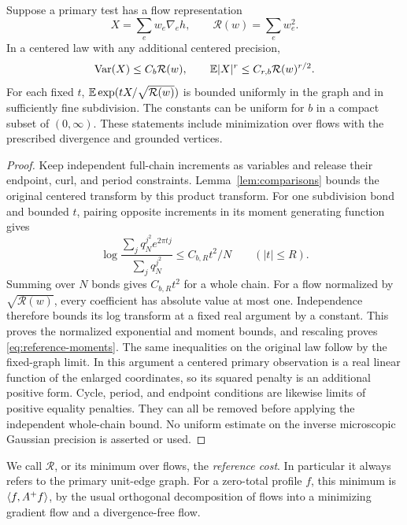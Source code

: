 \begin{lemma}\label{lem:reference-cost}
Suppose a primary test has a flow representation
\[
 X=\sum_e w_e\nabla_e h,\qquad
 \mathcal R(w)=\sum_e w_e^2.
\]
In a centered law with any additional centered precision,
\begin{equation}
 \operatorname{Var}(X)\le C_b\mathcal R(w),\qquad
 \mathbb E|X|^r\le C_{r,b}\mathcal R(w)^{r/2}.
 \label{eq:reference-moments}
\end{equation}
For each fixed \(t\),
\(\mathbb E\exp(tX/\sqrt{\mathcal R(w)})\) is bounded uniformly in the graph
and in sufficiently fine subdivision. The constants can be uniform
for \(b\) in a compact subset of \((0,\infty)\).
These statements include minimization over flows with the prescribed
divergence and grounded vertices.
\end{lemma}

\begin{proof}
Keep independent full-chain increments as variables and release
their endpoint, curl, and period constraints. Lemma~\ref{lem:comparisons}
bounds the original centered transform by this product transform.
For one subdivision bond and bounded \(t\), pairing opposite
increments in its moment generating function gives
\[
 \log\frac{\sum_jq_N^{j^2}e^{2\pi tj}}
               {\sum_jq_N^{j^2}}
 \le C_{b,R}t^2/N\qquad (|t|\le R).
\]
Summing over \(N\) bonds gives \(C_{b,R}t^2\) for a whole chain.
For a flow normalized by \(\sqrt{\mathcal R(w)}\), every coefficient
has absolute value at most one. Independence therefore bounds its
log transform at a fixed real argument by a constant. This proves
the normalized exponential and moment bounds, and rescaling proves
\eqref{eq:reference-moments}. The same inequalities on the original
law follow by the fixed-graph limit.
In this argument a centered primary observation is a real linear
function of the enlarged coordinates, so its squared penalty is
an additional positive form. Cycle, period, and endpoint conditions
are likewise limits of positive equality penalties. They can all
be removed before applying the independent whole-chain bound.
No uniform estimate on the inverse microscopic Gaussian precision
is asserted or used.
\end{proof}

We call \(\mathcal R\), or its minimum over flows, the
\emph{reference cost}. In particular it always refers to the primary
unit-edge graph. For a zero-total profile \(f\), this minimum is
\(\langle f,A^+f\rangle\), by the usual orthogonal decomposition of flows into
a minimizing gradient flow and a divergence-free flow.

